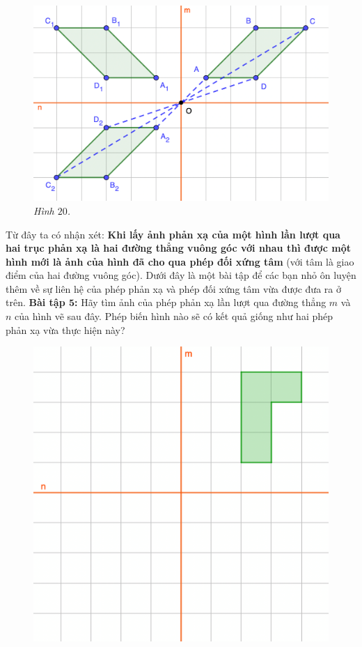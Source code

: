\begin{multicols}{2}
	\begin{figure}[H]
		\vspace*{-5pt}
		\centering
		\captionsetup{labelformat= empty, justification=centering}
		\includegraphics[width= 1\linewidth]{20}
		\caption{\small\textit{\color{toancuabi}Hình $20$.}}
		\vspace*{-10pt}
	\end{figure}
	Từ đây ta có nhận xét: \textbf{\color{toancuabi}Khi lấy ảnh phản xạ của một hình lần lượt qua hai trục phản xạ là hai đường thẳng vuông góc với nhau thì được một hình mới là ảnh của hình đã cho qua phép đối xứng tâm} (với tâm là giao điểm của hai đường vuông góc).
	\vskip 0.1cm
	Dưới đây là một bài tập để các bạn nhỏ ôn luyện thêm về sự liên hệ của phép phản xạ và phép đối xứng tâm vừa được đưa ra ở trên.
	\vskip 0.1cm
	\textbf{\color{toancuabi}Bài tập $\pmb5$:} Hãy tìm ảnh của phép phản xạ lần lượt qua đường thẳng $m$ và $n$ của hình vẽ sau đây. Phép biến hình nào sẽ có kết quả giống như hai phép phản xạ vừa thực hiện này?
	\begin{figure}[H]
		\vspace*{-5pt}
		\centering
		\captionsetup{labelformat= empty, justification=centering}
		\includegraphics[width= 1\linewidth]{21}

\end{figure}
\end{multicols}
